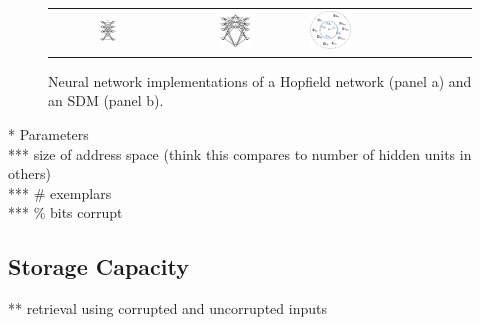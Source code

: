 \documentclass[10pt,letterpaper]{article}
\begin{document}
\begin{center}
\begin{figure}[tb]
{
	\hfill{}
	\begin{tabular}{lclclc}
	\raisebox{2.0in}{(a)} &
		\includegraphics[width=0.24\textwidth]{./figures/hopfieldNetwork.png} &
	\raisebox{2.0in}{(b)} &
		\includegraphics[width=0.27\textwidth]{./figures/sdmNetwork.png} 
	\raisebox{2.0in}{(c)} &
		\includegraphics[width=0.29\textwidth]{./figures/sdmOperations.png} &
	\end{tabular}
}
\hfill{}
\caption{Neural network implementations of a Hopfield network (panel a) and an SDM (panel b).}
\label{neuralNets}
\end{figure}
\end{center}

\noindent** Parameters \\
*** size of address space (think this compares to number of hidden units in others) \\
*** \# exemplars \\
*** \% bits corrupt \\

\subsection{Storage Capacity}
** retrieval using corrupted and uncorrupted inputs \\
\end{document}
